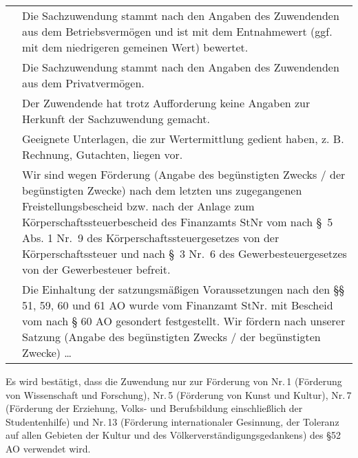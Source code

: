 \documentclass[12pt,ngerman]{scrartcl}
\newcommand{\marked}{\scalebox{1.5}{\XBox}} %
\newcommand{\notmarked}{\scalebox{1.5}{\Square}}
\begin{document}
{\footnotesize
\begin{tabular}{cp{}}
\hspace{1em} \marked & Die Sachzuwendung stammt nach den Angaben des Zuwendenden aus dem Betriebsvermögen und ist mit dem Entnahmewert (ggf. mit dem niedrigeren gemeinen Wert) bewertet. \\
\hspace{1em} \notmarked & Die Sachzuwendung stammt nach den Angaben des Zuwendenden aus dem Privatvermögen.  \\
\hspace{1em} \notmarked & Der Zuwendende hat trotz Aufforderung keine Angaben zur Herkunft der Sachzuwendung gemacht. \\
\hspace{1em} \notmarked & Geeignete Unterlagen, die zur Wertermittlung gedient haben, z. B. Rechnung, Gutachten, liegen vor. \\
\hspace{1em} \notmarked & Wir sind wegen Förderung (Angabe des begünstigten Zwecks / der begünstigten Zwecke) nach dem letzten uns zugegangenen Freistellungsbescheid bzw. nach der Anlage zum Körperschaftssteuerbescheid des Finanzamts \hspace{5em} StNr \hspace{5em} vom \hspace{5em} nach §~5 Abs. 1 Nr.~9 des Körperschaftssteuergesetzes von der Körperschaftssteuer und nach §~3 Nr.~6 des Gewerbesteuergesetzes von der Gewerbesteuer befreit. \\
\hspace{1em} \notmarked & Die Einhaltung der satzungsmäßigen Voraussetzungen nach den §§ 51, 59, 60 und 61 AO wurde vom Finanzamt \hspace{5em} StNr. \hspace{5em} mit Bescheid vom \hspace{5em} nach § 60 AO gesondert festgestellt. Wir fördern nach unserer Satzung (Angabe des begünstigten Zwecks / der begünstigten Zwecke) \ldots
\end{tabular}}

\begin{mdframed}[style=MyFormStyle]%
Es wird bestätigt, dass die Zuwendung nur zur Förderung von Nr.\,1 (Förderung von Wissenschaft und Forschung), Nr.\,5 (Förderung von Kunst und Kultur), Nr.\,7 (Förderung der Erziehung, Volks- und Berufsbildung einschließlich der Studentenhilfe) und Nr.\,13 (Förderung internationaler Gesinnung, der Toleranz auf allen Gebieten der Kultur und des Völkerverständigungsgedankens) des §52 AO verwendet wird.
\end{mdframed}
\end{document}
